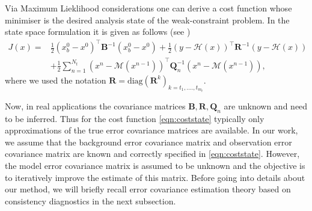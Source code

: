 \documentclass[a4paper,10pt]{article}
\numberwithin{equation}{section}
\begin{document}
Via Maximum Lieklihood considerations one can derive a cost function whose minimiser is the desired analysis state of the weak-constraint problem. In the state space formulation it is given as follows (see \cite{})
\begin{align}
J(x)=&\frac{1}{2}(x_b^0-x^0)^\top \mathbf B^{-1}(x_b^0-x^0)+\frac{1}{2}(y-\mathcal H(x))^\top \mathbf R^{-1}(y-\mathcal H(x))\\&+\frac{1}{2}\sum_{n=1}^{N_t}(x^n-\mathcal M(x^{n-1}))^\top \mathbf Q_n^{-1}(x^{n}-\mathcal M(x^{n-1})),
\label{eqn:coststate}
\end{align}
where we used the notation $\mathbf R=\text{diag}(\mathbf R^k)_{k=t_1,....,t_{m_t}}$.

Now, in real applications the covariance matrices $\mathbf B, \mathbf R, \mathbf Q_n$ are unknown and need to be inferred. Thus for the cost function \eqref{eqn:coststate} typically only approximations of the true error covariance matrices are available. In our work, we assume that the background error covariance matrix and observation error covariance matrix are known and correctly specified in \eqref{eqn:coststate}. However, the model error covariance matrix is assumed to be unknown and the objective is to iteratively improve the estimate of this matrix. Before going into details about our method, we will briefly recall error covariance estimation theory based on consistency diagnostics in the next subsection. 
\end{document}
